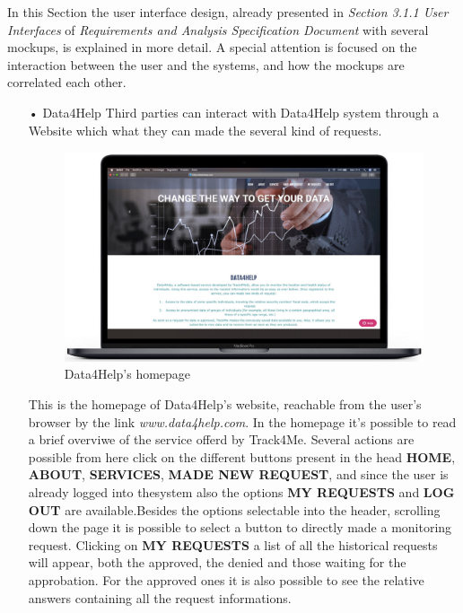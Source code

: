 \noindent
In this Section the user interface design, already presented in  \textit{Section 3.1.1 User Interfaces} of \textit{Requirements and Analysis Specification Document} with several mockups, is explained in more detail. A special attention is focused on the interaction between the user and the systems, and how the mockups are correlated each other.
\bigbreak
\noindent
\begin{enumerate}
\item[•]{\Large Data4Help}
\bigbreak
\noindent
Third parties can interact with Data4Help system through a Website which what they can made the several kind of requests.
\begin{figure}[H]
        \centering
          \includegraphics[scale = 0.33]{Images/Mockups/Homepage.jpg}
          	\caption{Data4Help's homepage}
\end{figure}
This is the homepage of Data4Help's website, reachable from the user's browser by the link \textit{www.data4help.com}. In the homepage it's possible to read a brief overviwe of the service offerd by Track4Me. Several actions are possible from here click on the different buttons present in the head \textbf{HOME}, \textbf{ABOUT}, \textbf{SERVICES}, \textbf{MADE NEW REQUEST}, and since the user is already logged into thesystem also the options \textbf{MY REQUESTS} and \textbf{LOG OUT} are available.Besides the options selectable into the header, scrolling down the page it is possible to select a button to directly made a monitoring request. 
\bigbreak
\noindent
Clicking on \textbf{MY REQUESTS} a list of all the historical requests will appear, both the approved, the denied and those waiting for the approbation. For the approved ones it is also possible to see the relative answers containing all the request informations.
\clearpage


\end{enumerate}
